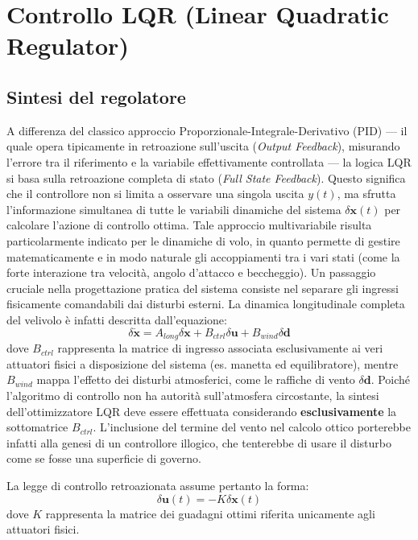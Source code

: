 \chapter{Controllo LQR (Linear Quadratic Regulator)}
\label{chap:disturbi_vento}
\label{cap:lqr}
 \label{sec:cap12_1}
 \label{sec:Capitolo 12Wind}

\section{Sintesi del regolatore }
A differenza del classico approccio Proporzionale-Integrale-Derivativo (PID) — il quale opera tipicamente in retroazione sull'uscita (\textit{Output Feedback}), misurando l'errore tra il riferimento e la variabile effettivamente controllata — la logica LQR si basa sulla retroazione completa di stato (\textit{Full State Feedback}). Questo significa che il controllore non si limita a osservare una singola uscita $y(t)$, ma sfrutta l'informazione simultanea di tutte le variabili dinamiche del sistema $\delta\mathbf{x}(t)$ per calcolare l'azione di controllo ottima. Tale approccio multivariabile risulta particolarmente indicato per le dinamiche di volo, in quanto permette di gestire matematicamente e in modo naturale gli accoppiamenti tra i vari stati (come la forte interazione tra velocità, angolo d'attacco e beccheggio). Un passaggio cruciale nella progettazione pratica del sistema consiste nel separare gli ingressi fisicamente comandabili dai disturbi esterni. La dinamica longitudinale completa del velivolo è infatti descritta dall'equazione:
\begin{equation}
    \delta\dot{\mathbf{x}} = A_{long} \delta\mathbf{x} + B_{ctrl} \delta\mathbf{u} + B_{wind} \delta\mathbf{d}
\end{equation}
dove $B_{ctrl}$ rappresenta la matrice di ingresso associata esclusivamente ai veri attuatori fisici a disposizione del sistema (es. manetta ed equilibratore), mentre $B_{wind}$ mappa l'effetto dei disturbi atmosferici, come le raffiche di vento $\delta\mathbf{d}$. Poiché l'algoritmo di controllo non ha autorità sull'atmosfera circostante, la sintesi dell'ottimizzatore LQR deve essere effettuata considerando \textbf{esclusivamente} la sottomatrice $B_{ctrl}$. L'inclusione del termine del vento nel calcolo ottico porterebbe infatti alla genesi di un controllore illogico, che tenterebbe di usare il disturbo come se fosse una superficie di governo.

La legge di controllo retroazionata assume pertanto la forma:
\begin{equation}
    \delta\mathbf{u}(t) = -K \delta\mathbf{x}(t)
\end{equation}
dove $K$ rappresenta la matrice dei guadagni ottimi riferita unicamente agli attuatori fisici.

